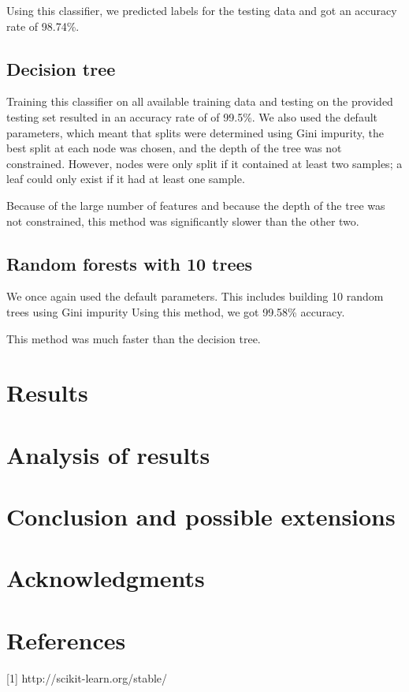 \documentclass{article} %
\begin{document}
Using this classifier, we predicted labels for the testing data and got an accuracy rate of 98.74\%. 
\subsection{Decision tree}
Training this classifier on all available training data and testing on the provided testing set resulted in an accuracy rate of of 99.5\%. We also used the default parameters, which meant that splits were determined using Gini impurity, the best split at each node was chosen, and the depth of the tree was not constrained. However, nodes were only split if it contained at least two samples; a leaf could only exist if it had at least one sample. 

Because of the large number of features and because the depth of the tree was not constrained, this method was significantly slower than the other two.
\subsection{Random forests with 10 trees}
We once again used the default parameters. This includes building 10 random trees using Gini impurity 
Using this method, we got 99.58\% accuracy. 

This method was much faster than the decision tree.

\section{Results}

\section{Analysis of results}

\section{Conclusion and possible extensions}

\section{Acknowledgments}

\section{References}

[1] http://scikit-learn.org/stable/
\end{document}
